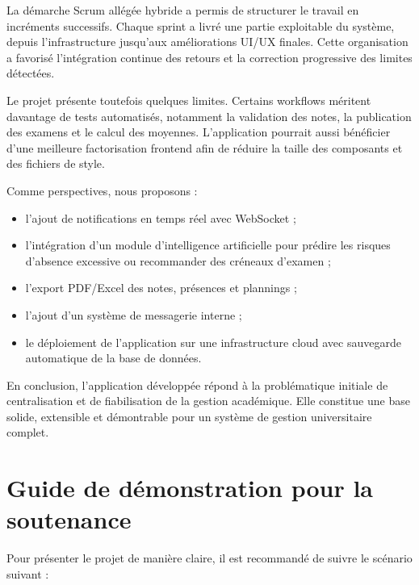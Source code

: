 \documentclass[12pt,a4paper]{report}
\begin{document}
La démarche Scrum allégée hybride a permis de structurer le travail en incréments successifs. Chaque sprint a livré une partie exploitable du système, depuis l'infrastructure jusqu'aux améliorations UI/UX finales. Cette organisation a favorisé l'intégration continue des retours et la correction progressive des limites détectées.

Le projet présente toutefois quelques limites. Certains workflows méritent davantage de tests automatisés, notamment la validation des notes, la publication des examens et le calcul des moyennes. L'application pourrait aussi bénéficier d'une meilleure factorisation frontend afin de réduire la taille des composants et des fichiers de style.

Comme perspectives, nous proposons :

\begin{itemize}[itemsep=0.4em]
    \item l'ajout de notifications en temps réel avec WebSocket ;
    \item l'intégration d'un module d'intelligence artificielle pour prédire les risques d'absence excessive ou recommander des créneaux d'examen ;
    \item l'export PDF/Excel des notes, présences et plannings ;
    \item l'ajout d'un système de messagerie interne ;
    \item le déploiement de l'application sur une infrastructure cloud avec sauvegarde automatique de la base de données.
\end{itemize}

En conclusion, l'application développée répond à la problématique initiale de centralisation et de fiabilisation de la gestion académique. Elle constitue une base solide, extensible et démontrable pour un système de gestion universitaire complet.

\chapter*{Guide de démonstration pour la soutenance}

Pour présenter le projet de manière claire, il est recommandé de suivre le scénario suivant :
\end{document}

